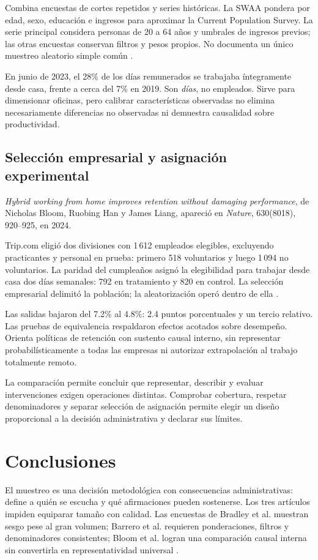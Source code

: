 {Combina encuestas de cortes repetidos y series históricas. La SWAA pondera por edad, sexo, educación e ingresos para aproximar la Current Population Survey. La serie principal considera personas de 20 a 64 años y umbrales de ingresos previos; las otras encuestas conservan filtros y pesos propios. No documenta un único muestreo aleatorio simple común \citep{barrero2023}.

En junio de 2023, el 28\% de los días remunerados se trabajaba íntegramente desde casa, frente a cerca del 7\% en 2019. Son \textit{días}, no empleados. Sirve para dimensionar oficinas, pero calibrar características observadas no elimina necesariamente diferencias no observadas ni demuestra causalidad sobre productividad.

\subsection{Selección empresarial y asignación experimental}
\textit{Hybrid working from home improves retention without damaging performance}, de Nicholas Bloom, Ruobing Han y James Liang, apareció en \textit{Nature}, 630(8018), 920--925, en 2024.

Trip.com eligió dos divisiones con 1\,612 empleados elegibles, excluyendo practicantes y personal en prueba: primero 518 voluntarios y luego 1\,094 no voluntarios. La paridad del cumpleaños asignó la elegibilidad para trabajar desde casa dos días semanales: 792 en tratamiento y 820 en control. La selección empresarial delimitó la población; la aleatorización operó dentro de ella \citep{bloom2024}.

Las salidas bajaron del 7.2\% al 4.8\%: 2.4 puntos porcentuales y un tercio relativo. Las pruebas de equivalencia respaldaron efectos acotados sobre desempeño. Orienta políticas de retención con sustento causal interno, sin representar probabilísticamente a todas las empresas ni autorizar extrapolación al trabajo totalmente remoto.

La comparación permite concluir que representar, describir y evaluar intervenciones exigen operaciones distintas. Comprobar cobertura, respetar denominadores y separar selección de asignación permite elegir un diseño proporcional a la decisión administrativa y declarar sus límites.

\section{Conclusiones}
El muestreo es una decisión metodológica con consecuencias administrativas: define a quién se escucha y qué afirmaciones pueden sostenerse. Los tres artículos impiden equiparar tamaño con calidad. Las encuestas de Bradley et al. muestran sesgo pese al gran volumen; Barrero et al. requieren ponderaciones, filtros y denominadores consistentes; Bloom et al. logran una comparación causal interna sin convertirla en representatividad universal \citep{bradley2021,barrero2023,bloom2024}.

}
